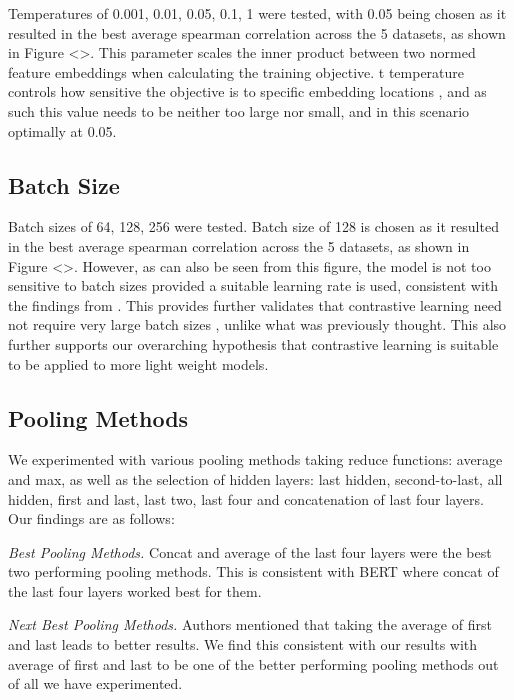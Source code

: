 \documentclass[10pt,twocolumn,letterpaper]{article}
\begin{document}
Temperatures of 0.001, 0.01, 0.05, 0.1, 1 were tested, with 0.05 being chosen as it resulted in the best average spearman correlation across the 5 datasets, as shown in Figure <>.  This parameter scales the inner product between two normed feature embeddings\cite{2112.01642} when calculating the training objective. t temperature controls how sensitive the objective is to specific embedding locations \cite{2110.04403}, and as such this value needs to be neither too large nor small, and in this scenario optimally at 0.05.

\subsection{Batch Size}

Batch sizes of 64, 128, 256 were tested. Batch size of 128 is chosen as it resulted in the best average spearman correlation across the 5 datasets, as shown in Figure <>. However, as can also be seen from this figure, the model is not too sensitive to batch sizes provided a suitable learning rate is used, consistent with the findings from \cite{2104.08821}. This provides further validates that contrastive learning need not require very large batch sizes \cite{2104.08821}, unlike what was previously thought\cite{2002.05709}. This also further supports our overarching hypothesis that contrastive learning is suitable to be applied to more light weight models.

\subsection{Pooling Methods}

We experimented with various pooling methods taking reduce functions: average and max, as well as the selection of hidden layers: last hidden, second-to-last, all hidden, first and last, last two, last four and concatenation of last four layers. Our findings are as follows:

\textit{Best Pooling Methods.} Concat and average of the last four layers were the best two performing pooling methods. This is consistent with BERT \cite{1907.11692} where concat of the last four layers worked best for them.

\textit{Next Best Pooling Methods.} Authors \cite{li-etal-2020-sentence} \cite{https://doi.org/10.48550/arxiv.1908.10084} mentioned that taking the average of first and last leads to better results. We find this consistent with our results with average of first and last to be one of the better performing pooling methods out of all we have experimented.
\end{document}
